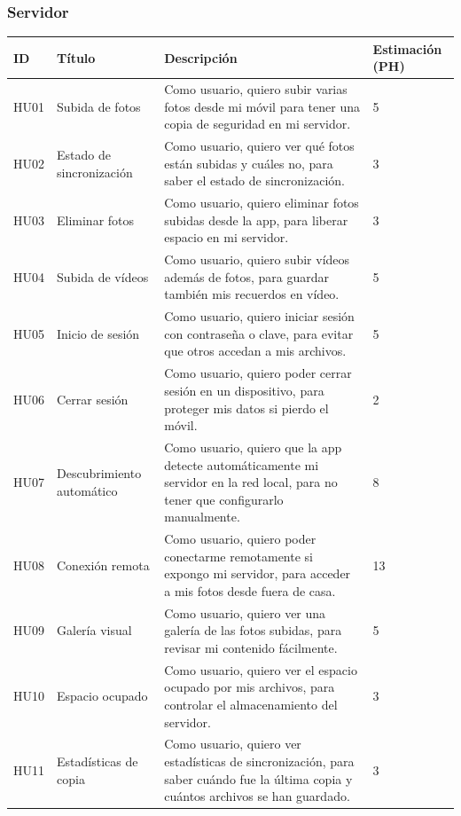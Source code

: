 \subsubsection{Servidor}
\renewcommand{\arraystretch}{1.3} %

\begin{tabularx}{\textwidth}{|l|l|>{\raggedright\arraybackslash}X|p{2cm}|}
    \hline
    \textbf{ID} & \textbf{Título} & \textbf{Descripción} & \textbf{Estimación (PH)} \\
    \hline
    HU01 & Subida de fotos & Como usuario, quiero subir varias fotos desde mi móvil para tener una copia de seguridad en mi servidor. & 5 \\
    \hline
    HU02 & Estado de sincronización & Como usuario, quiero ver qué fotos están subidas y cuáles no, para saber el estado de sincronización. & 3 \\
    \hline
    HU03 & Eliminar fotos & Como usuario, quiero eliminar fotos subidas desde la app, para liberar espacio en mi servidor. & 3 \\
    \hline
    HU04 & Subida de vídeos & Como usuario, quiero subir vídeos además de fotos, para guardar también mis recuerdos en vídeo. & 5 \\
    \hline
    HU05 & Inicio de sesión & Como usuario, quiero iniciar sesión con contraseña o clave, para evitar que otros accedan a mis archivos. & 5 \\
    \hline
    HU06 & Cerrar sesión & Como usuario, quiero poder cerrar sesión en un dispositivo, para proteger mis datos si pierdo el móvil. & 2 \\
    \hline
    HU07 & Descubrimiento automático & Como usuario, quiero que la app detecte automáticamente mi servidor en la red local, para no tener que configurarlo manualmente. & 8 \\
    \hline
    HU08 & Conexión remota & Como usuario, quiero poder conectarme remotamente si expongo mi servidor, para acceder a mis fotos desde fuera de casa. & 13 \\
    \hline
    HU09 & Galería visual & Como usuario, quiero ver una galería de las fotos subidas, para revisar mi contenido fácilmente. & 5 \\
    \hline
    HU10 & Espacio ocupado & Como usuario, quiero ver el espacio ocupado por mis archivos, para controlar el almacenamiento del servidor. & 3 \\
    \hline
    HU11 & Estadísticas de copia & Como usuario, quiero ver estadísticas de sincronización, para saber cuándo fue la última copia y cuántos archivos se han guardado. & 3 \\

\end{tabularx}
